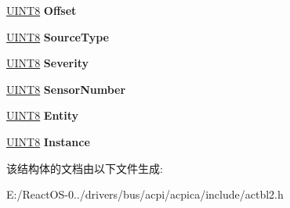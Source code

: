 \begin{DoxyCompactItemize}
\hyperlink{_processor_bind_8h_ab27e9918b538ce9d8ca692479b375b6a}{U\+I\+N\+T8} {\bfseries Offset}
\item 
\mbox{\label{structacpi__asf__alert__data_abde0ddedb9457c5cc29b35bb2344eeff}} 
\hyperlink{_processor_bind_8h_ab27e9918b538ce9d8ca692479b375b6a}{U\+I\+N\+T8} {\bfseries Source\+Type}
\item 
\mbox{\label{structacpi__asf__alert__data_aad7b4a2822650f4376a61013f28e41db}} 
\hyperlink{_processor_bind_8h_ab27e9918b538ce9d8ca692479b375b6a}{U\+I\+N\+T8} {\bfseries Severity}
\item 
\mbox{\label{structacpi__asf__alert__data_a3b136a29c1b1202a53512a0ab40b3ae7}} 
\hyperlink{_processor_bind_8h_ab27e9918b538ce9d8ca692479b375b6a}{U\+I\+N\+T8} {\bfseries Sensor\+Number}
\item 
\mbox{\label{structacpi__asf__alert__data_a1b5a4fe20bf8e4c97585e96dc852cfaf}} 
\hyperlink{_processor_bind_8h_ab27e9918b538ce9d8ca692479b375b6a}{U\+I\+N\+T8} {\bfseries Entity}
\item 
\mbox{\label{structacpi__asf__alert__data_a62696a85e70d0bcfcebd73a6e1125ec8}} 
\hyperlink{_processor_bind_8h_ab27e9918b538ce9d8ca692479b375b6a}{U\+I\+N\+T8} {\bfseries Instance}
\end{DoxyCompactItemize}


该结构体的文档由以下文件生成\+:\begin{DoxyCompactItemize}
\item 
E\+:/\+React\+O\+S-\/0../drivers/bus/acpi/acpica/include/actbl2.\+h\end{DoxyCompactItemize}
